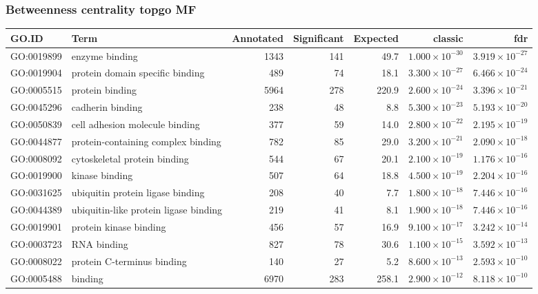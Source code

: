 \subsubsection{Betweenness centrality topgo MF}
\begin{table}[ht]
\centering
\begin{tabular}{llrrrrr}
  \hline
GO.ID & Term & Annotated & Significant & Expected & classic & fdr \\ 
  \hline
GO:0019899 & enzyme binding & 1343 & 141 & 49.7 & $1.000 \times 10^{-30}$ & $3.919 \times 10^{-27}$ \\ 
  GO:0019904 & protein domain specific binding & 489 & 74 & 18.1 & $3.300 \times 10^{-27}$ & $6.466 \times 10^{-24}$ \\ 
  GO:0005515 & protein binding & 5964 & 278 & 220.9 & $2.600 \times 10^{-24}$ & $3.396 \times 10^{-21}$ \\ 
  GO:0045296 & cadherin binding & 238 & 48 & 8.8 & $5.300 \times 10^{-23}$ & $5.193 \times 10^{-20}$ \\ 
  GO:0050839 & cell adhesion molecule binding & 377 & 59 & 14.0 & $2.800 \times 10^{-22}$ & $2.195 \times 10^{-19}$ \\ 
  GO:0044877 & protein-containing complex binding & 782 & 85 & 29.0 & $3.200 \times 10^{-21}$ & $2.090 \times 10^{-18}$ \\ 
  GO:0008092 & cytoskeletal protein binding & 544 & 67 & 20.1 & $2.100 \times 10^{-19}$ & $1.176 \times 10^{-16}$ \\ 
  GO:0019900 & kinase binding & 507 & 64 & 18.8 & $4.500 \times 10^{-19}$ & $2.204 \times 10^{-16}$ \\ 
  GO:0031625 & ubiquitin protein ligase binding & 208 & 40 & 7.7 & $1.800 \times 10^{-18}$ & $7.446 \times 10^{-16}$ \\ 
  GO:0044389 & ubiquitin-like protein ligase binding & 219 & 41 & 8.1 & $1.900 \times 10^{-18}$ & $7.446 \times 10^{-16}$ \\ 
  GO:0019901 & protein kinase binding & 456 & 57 & 16.9 & $9.100 \times 10^{-17}$ & $3.242 \times 10^{-14}$ \\ 
  GO:0003723 & RNA binding & 827 & 78 & 30.6 & $1.100 \times 10^{-15}$ & $3.592 \times 10^{-13}$ \\ 
  GO:0008022 & protein C-terminus binding & 140 & 27 & 5.2 & $8.600 \times 10^{-13}$ & $2.593 \times 10^{-10}$ \\ 
  GO:0005488 & binding & 6970 & 283 & 258.1 & $2.900 \times 10^{-12}$ & $8.118 \times 10^{-10}$ \\ 

\end{tabular}
\end{table}
